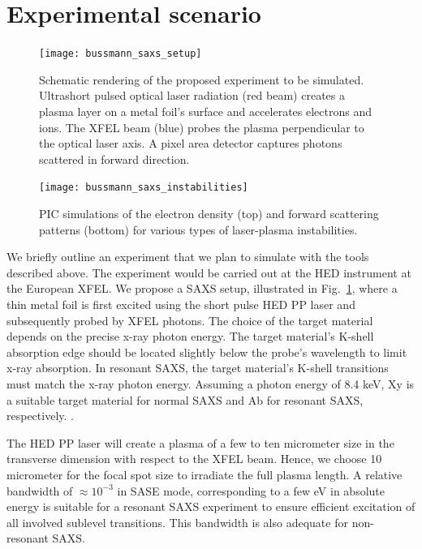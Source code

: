 \documentclass[12pt]{scrartcl}
\begin{document}
\section{Experimental scenario}
%
\begin{figure}[ht]
  \begin{center}
    \texttt{[image: bussmann\_saxs\_setup]}
  \end{center}
  \caption{Schematic rendering of the proposed experiment to be simulated.
  Ultrashort pulsed optical laser radiation (red beam) creates a plasma layer on
a metal foil's surface and accelerates electrons and ions. The XFEL beam (blue)
probes the plasma perpendicular to the optical laser axis. A pixel area detector
captures photons scattered in forward direction.}
  \label{fig:xfel-saxs_setup}
\end{figure}
%
\begin{figure}[ht]
  \begin{center}
    \texttt{[image: bussmann\_saxs\_instabilities]}
  \end{center}
  \caption{PIC simulations of the electron density (top) and forward scattering
    patterns (bottom) for various
  types of laser-plasma instabilities.}
  \label{fig:saxs_instabilities}
\end{figure}

We briefly outline an experiment that we plan to simulate with
the tools described above. The experiment would be carried out at the HED
instrument at the European XFEL. We propose a SAXS setup, illustrated in
Fig.~\ref{fig:xfel-saxs_setup}, where a thin metal foil is
first excited using the short pulse HED PP laser and subsequently probed by XFEL
photons.
The choice of the target material depends on the precise x-ray photon energy.
The target material's K-shell absorption edge should be located slightly
below the probe's wavelength to limit x-ray absorption. In resonant
SAXS, the target material's K-shell transitions must match the x-ray photon
energy. Assuming a photon energy of 8.4 keV, Xy is a suitable target material
for normal SAXS and Ab for resonant SAXS, respectively. .

The HED PP laser will
create a plasma of a few to ten micrometer size in the transverse dimension with
respect to the XFEL beam. Hence, we choose 10 micrometer for the focal spot size
to irradiate the full plasma length. A relative bandwidth of
$\approx 10^{-3}$ in SASE mode, corresponding to a few eV in absolute energy is
suitable for a resonant SAXS experiment to ensure efficient excitation of all
involved sublevel transitions. This bandwidth is also adequate for non-resonant SAXS.
\end{document}
